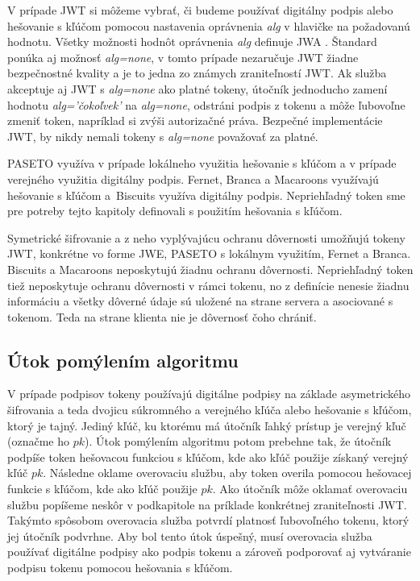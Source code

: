 V prípade JWT si môžeme vybrať, či budeme používať digitálny podpis alebo hešovanie s kľúčom pomocou nastavenia oprávnenia \textit{alg} v hlavičke na požadovanú hodnotu. Všetky možnosti hodnôt oprávnenia \textit{alg} definuje  JWA \cite{jwa_rfc}. Štandard ponúka aj možnosť \textit{alg=none}, v tomto prípade nezaručuje JWT žiadne bezpečnostné kvality a je to jedna zo známych zraniteľností \cite{jwt_vul} JWT. Ak služba akceptuje aj JWT s \textit{alg=none} ako platné tokeny, útočník jednoducho zamení hodnotu \textit{alg='čokoľvek'} na \textit{alg=none}, odstráni podpis z tokenu a môže ľubovoľne zmeniť token, napríklad si zvýši autorizačné práva. Bezpečné implementácie JWT, by nikdy nemali tokeny s \textit{alg=none} považovať za platné.

PASETO využíva v prípade lokálneho využitia hešovanie s kľúčom a v prípade verejného využitia digitálny podpis. Fernet, Branca a Macaroons využívajú hešovanie s kľúčom a~Biscuits využíva digitálny podpis. Nepriehľadný token sme pre potreby tejto kapitoly definovali s použitím hešovania s kľúčom.

Symetrické šifrovanie a z neho vyplývajúcu ochranu dôvernosti umožňujú tokeny JWT, konkrétne vo forme JWE, PASETO s lokálnym využitím, Fernet a Branca. Biscuits a Macaroons neposkytujú žiadnu ochranu dôvernosti. Nepriehľadný token tiež neposkytuje ochranu dôvernosti v rámci tokenu, no z definície nenesie žiadnu informáciu a všetky dôverné údaje sú uložené na strane servera a asociované s tokenom. Teda na strane klienta nie je dôvernosť čoho chrániť.

\subsection{Útok pomýlením algoritmu}

V prípade podpisov tokeny používajú digitálne podpisy na základe asymetrického šifrovania a teda dvojicu súkromného a verejného kľúča alebo hešovanie s kľúčom, ktorý je tajný. Jediný kľúč, ku ktorému má útočník ľahký prístup je verejný kľuč (označme ho $pk$). Útok pomýlením algoritmu potom prebehne tak, že útočník podpíše token hešovacou funkciou s kľúčom, kde ako kľúč použije získaný verejný kľúč $pk$. Následne oklame overovaciu službu, aby token overila pomocou hešovacej funkcie s kľúčom, kde ako kľúč použije $pk$. Ako útočník môže oklamať overovaciu službu popíšeme neskôr v podkapitole na príklade konkrétnej zraniteľnosti JWT. Takýmto spôsobom overovacia služba potvrdí platnosť ľubovoľného tokenu, ktorý jej útočník podvrhne. Aby bol tento útok úspešný, musí overovacia služba používať digitálne podpisy ako podpis tokenu a zároveň podporovať aj vytváranie podpisu tokenu pomocou hešovania s kľúčom.

